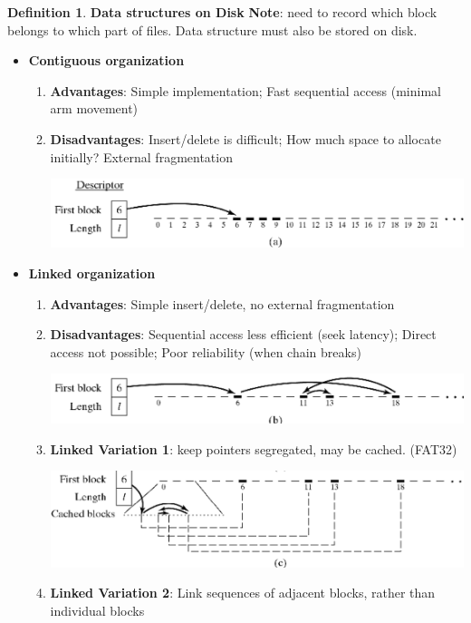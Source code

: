 \documentclass[11pt,a4paper]{article}
\theoremstyle{definition}
\newtheorem{definition}{Definition}[section]
\newenvironment{myitemize}
{ \begin{itemize}
    \setlength{\itemsep}{5pt}
    \setlength{\parskip}{0pt}
    \setlength{\parsep}{0pt}     }
{ \end{itemize}                  }
\newenvironment{myenumerate}
{ \begin{enumerate}
    \setlength{\itemsep}{5pt}
    \setlength{\parskip}{0pt}
    \setlength{\parsep}{0pt}     }
{ \end{enumerate}                }
\begin{document}
\begin{definition}{\textbf{Data structures on Disk}}
	\textbf{Note}: need to record which block belongs to which part of files. Data structure must also be stored on disk.
	\begin{myitemize}
		\item \textbf{Contiguous organization}
		\begin{myenumerate}
			\item \textbf{Advantages}: Simple implementation; Fast sequential access (minimal arm movement)
			\item \textbf{Disadvantages}: Insert/delete is difficult; How much space to allocate initially? External fragmentation

			\includegraphics[width=1.0\linewidth]{m2/contiguousOrganization}
		\end{myenumerate}
		\item \textbf{Linked organization}
		\begin{myenumerate}
			\item \textbf{Advantages}: Simple insert/delete, no external fragmentation
			\item \textbf{Disadvantages}: Sequential access less efficient (seek latency); Direct access not possible; Poor reliability (when chain breaks)

			\includegraphics[width=1.0\linewidth]{m2/linkedOrganization}
			
			\item \textbf{Linked Variation 1}: keep pointers segregated, may be cached. (FAT32)

			\includegraphics[width=1.0\linewidth]{m2/linkedVariation1}
			
			\item \textbf{Linked Variation 2}: Link sequences of adjacent blocks, rather than individual blocks 
			

\end{myenumerate}
\end{myitemize}
\end{definition}
\end{document}
